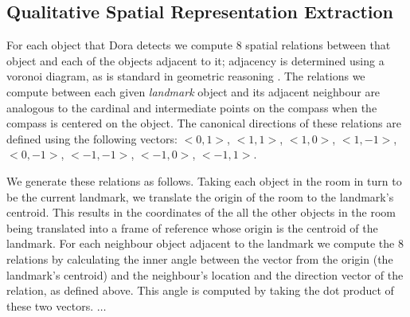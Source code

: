 \subsection{Qualitative Spatial Representation Extraction}

For each object that Dora detects we compute 8 spatial relations between that object and each of the objects adjacent to it; adjacency is determined using a voronoi diagram, as is standard in geometric reasoning \cite{Forbus/etal2003}. The relations we compute between each given \emph{landmark} object and its adjacent neighbour are analogous to the cardinal and intermediate points on the compass when the compass is centered on the object. The canonical directions of these relations are defined using the following vectors: $<0,1>$, $<1,1>$, $<1,0>$, $<1,-1>$, $<0,-1>$, $<-1,-1>$, $<-1,0>$, $<-1,1>$.

We generate these relations as follows. Taking each object in the room in turn to be the current landmark, we translate the origin of the room to the landmark's centroid. This results in the coordinates of the all the other objects in the room being translated into a frame of reference whose origin is the centroid of the landmark.  For each neighbour object adjacent to the landmark we compute the 8 relations by calculating the inner angle between the vector from the origin (the landmark's centroid) and the neighbour's location and the direction vector of the relation, as defined above. This angle is computed by taking the dot product of these two vectors. $\dots$




